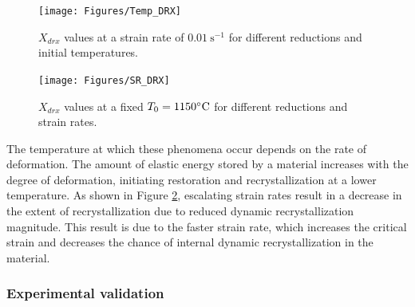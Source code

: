 \documentclass[metals,article,submit,pdftex,moreauthors]{Definitions/mdpi}
\DeclareRobustCommand{\ps}{\text{s}^{-1}}
\begin{document}
\begin{figure}[H]
\centering
\texttt{[image: Figures/Temp\_DRX]}
\caption{$X_{drx}$ values at a strain rate of $0.01~\ps$ for different reductions and initial temperatures.}
\label{fig:TempEffect}
\end{figure}
\begin{figure}[H]
\centering
\texttt{[image: Figures/SR\_DRX]}
\caption{$X_{drx}$ values at a fixed $T_0=1150\celsius$ for different reductions and strain rates.}
\label{fig:SREffect}
\end{figure}

The temperature at which these phenomena occur depends on the rate of deformation. 
The amount of elastic energy stored by a material increases with the degree of deformation, initiating restoration and recrystallization at a lower temperature.
As shown in Figure \ref{fig:SREffect}, escalating strain rates result in a decrease in the extent of recrystallization due to reduced dynamic recrystallization magnitude.
This result is due to the faster strain rate, which increases the critical strain and decreases the chance of internal dynamic recrystallization in the material.

\subsubsection{Experimental validation \label{subsec:ExpValid}}
\end{document}
